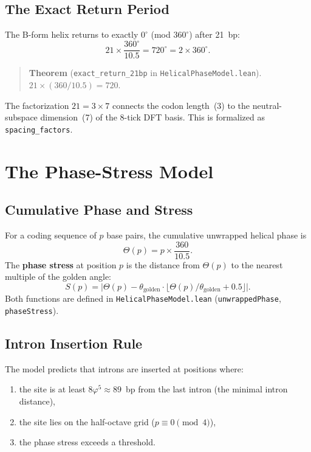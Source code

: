 \documentclass[11pt,twocolumn]{article}
\begin{document}
\subsection{The Exact Return Period}

The B-form helix returns to exactly $0^\circ$ (mod $360^\circ$) after
21~bp:
\[
  21 \times \frac{360^\circ}{10.5} = 720^\circ = 2 \times 360^\circ.
\]

\begin{quote}
\textbf{Theorem} (\texttt{exact\_return\_21bp} in
\texttt{HelicalPhaseModel.lean}).
$21 \times (360 / 10.5) = 720$.
\end{quote}

The factorization $21 = 3 \times 7$ connects the codon length~(3) to
the neutral-subspace dimension~(7) of the 8-tick DFT basis. This is
formalized as \texttt{spacing\_factors}.

\section{The Phase-Stress Model}

\subsection{Cumulative Phase and Stress}

For a coding sequence of $p$ base pairs, the cumulative unwrapped helical
phase is
\[
  \Theta(p) = p \times \frac{360}{10.5}.
\]
The \textbf{phase stress} at position $p$ is the distance from
$\Theta(p)$ to the nearest multiple of the golden angle:
\[
  S(p) = \bigl|\Theta(p) - \theta_{\mathrm{golden}} \cdot
  \lfloor \Theta(p) / \theta_{\mathrm{golden}} + 0.5 \rfloor\bigr|.
\]
Both functions are defined in \texttt{HelicalPhaseModel.lean}
(\texttt{unwrappedPhase}, \texttt{phaseStress}).

\subsection{Intron Insertion Rule}

The model predicts that introns are inserted at positions where:
\begin{enumerate}
\item the site is at least $8\varphi^5 \approx 89$~bp from the last intron
  (the minimal intron distance),
\item the site lies on the half-octave grid ($p \equiv 0 \pmod{4}$),
\item the phase stress exceeds a threshold.
\end{enumerate}
\end{document}
